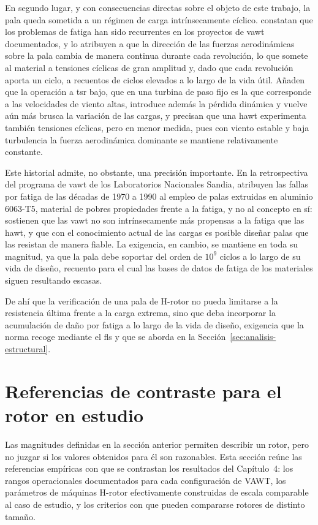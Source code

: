 En segundo lugar, y con consecuencias directas sobre el objeto de este trabajo, la pala queda sometida a un régimen de carga intrínsecamente cíclico. \textcite{Mollerstrom2019} constatan que los problemas de fatiga han sido recurrentes en los proyectos de \gls{vawt} documentados, y lo atribuyen a que la dirección de las fuerzas aerodinámicas sobre la pala cambia de manera continua durante cada revolución, lo que somete al material a tensiones cíclicas de gran amplitud y, dado que cada revolución aporta un ciclo, a recuentos de ciclos elevados a lo largo de la vida útil. Añaden que la operación a \gls{tsr} bajo, que en una turbina de paso fijo es la que corresponde a las velocidades de viento altas, introduce además la pérdida dinámica y vuelve aún más brusca la variación de las cargas, y precisan que una \gls{hawt} experimenta también tensiones cíclicas, pero en menor medida, pues con viento estable y baja turbulencia la fuerza aerodinámica dominante se mantiene relativamente constante.

Este historial admite, no obstante, una precisión importante. En la retrospectiva del programa de \gls{vawt} de los Laboratorios Nacionales Sandia, \textcite{Sutherland2012} atribuyen las fallas por fatiga de las décadas de 1970 a 1990 al empleo de palas extruidas en aluminio 6063-T5, material de pobres propiedades frente a la fatiga, y no al concepto en sí: sostienen que las \gls{vawt} no son intrínsecamente más propensas a la fatiga que las \gls{hawt}, y que con el conocimiento actual de las cargas es posible diseñar palas que las resistan de manera fiable. La exigencia, en cambio, se mantiene en toda su magnitud, ya que la pala debe soportar del orden de $10^9$ ciclos a lo largo de su vida de diseño, recuento para el cual las bases de datos de fatiga de los materiales siguen resultando escasas.

De ahí que la verificación de una pala de H-rotor no pueda limitarse a la resistencia última frente a la carga extrema, sino que deba incorporar la acumulación de daño por fatiga a lo largo de la vida de diseño, exigencia que la norma recoge mediante el \gls{fls} y que se aborda en la Sección~\ref{sec:analisis-estructural}.
\section{Referencias de contraste para el rotor en estudio}
\label{sec:referencias-contraste}

Las magnitudes definidas en la sección anterior permiten describir un rotor, pero no juzgar si los valores obtenidos para él son razonables. Esta sección reúne las referencias empíricas con que se contrastan los resultados del Capítulo~4: los rangos operacionales documentados para cada configuración de VAWT, los parámetros de máquinas H-rotor efectivamente construidas de escala comparable al caso de estudio, y los criterios con que pueden compararse rotores de distinto tamaño.

